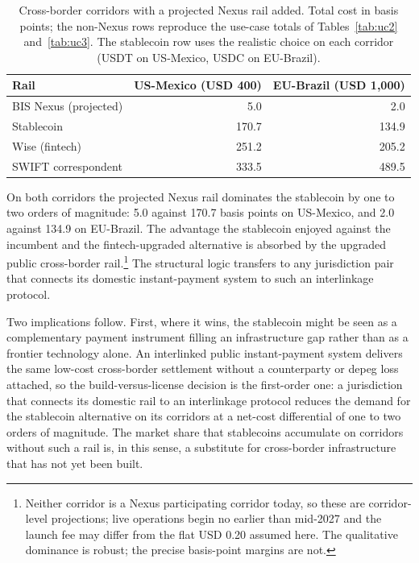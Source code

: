 \begin{table}[H]
\centering
\caption{Cross-border corridors with a projected Nexus rail added. Total cost in basis points; the non-Nexus rows reproduce the use-case totals of Tables~\ref{tab:uc2} and~\ref{tab:uc3}. The stablecoin row uses the realistic choice on each corridor (USDT on US-Mexico, USDC on EU-Brazil).}\label{tab:nexus_cross_border}
\begin{tabular}{lrr}
\toprule
Rail & US-Mexico (USD 400) & EU-Brazil (USD 1{,}000) \\
\midrule
BIS Nexus (projected) & 5.0   & 2.0   \\
Stablecoin            & 170.7 & 134.9 \\
Wise (fintech)        & 251.2 & 205.2 \\
SWIFT correspondent   & 333.5 & 489.5 \\
\bottomrule
\end{tabular}
\end{table}

On both corridors the projected Nexus rail dominates the stablecoin by one to two orders of magnitude: 5.0 against 170.7 basis points on US-Mexico, and 2.0 against 134.9 on EU-Brazil. The advantage the stablecoin enjoyed against the incumbent and the fintech-upgraded alternative is absorbed by the upgraded public cross-border rail.\footnote{Neither corridor is a Nexus participating corridor today, so these are corridor-level projections; live operations begin no earlier than mid-2027 and the launch fee may differ from the flat USD 0.20 assumed here. The qualitative dominance is robust; the precise basis-point margins are not.} The structural logic transfers to any jurisdiction pair that connects its domestic instant-payment system to such an interlinkage protocol.

Two implications follow. First, where it wins, the stablecoin might be seen as a complementary payment instrument filling an infrastructure gap rather than as a frontier technology alone. An interlinked public instant-payment system delivers the same low-cost cross-border settlement without a counterparty or depeg loss attached, so the build-versus-license decision is the first-order one: a jurisdiction that connects its domestic rail to an interlinkage protocol reduces the demand for the stablecoin alternative on its corridors at a net-cost differential of one to two orders of magnitude. The market share that stablecoins accumulate on corridors without such a rail is, in this sense, a substitute for cross-border infrastructure that has not yet been built.

